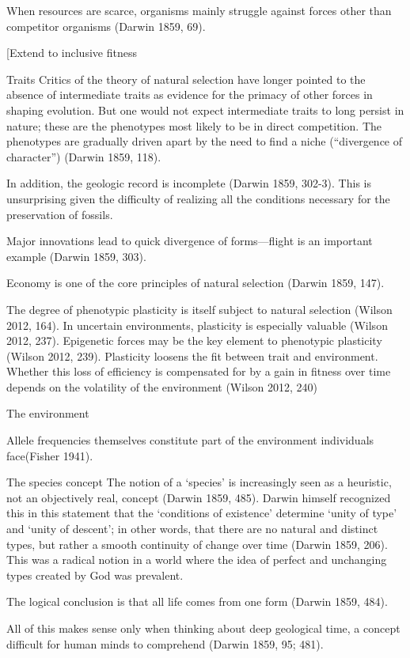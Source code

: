 \documentclass{tufte-book} %
\begin{document}
When resources are scarce, organisms mainly struggle against forces other than competitor organisms (Darwin 1859, 69). 

[Extend to inclusive fitness

Traits 
Critics of the theory of  natural selection have longer pointed to the absence of intermediate traits as evidence for the primacy of other forces in shaping evolution. But one would not expect intermediate traits to long persist in nature; these are the phenotypes most likely to be in direct competition. The phenotypes are gradually driven apart by the need to find a niche (“divergence of character”) (Darwin 1859, 118). 

In addition, the geologic record is incomplete (Darwin 1859, 302-3). This is unsurprising given the difficulty of realizing all the conditions necessary for the preservation of fossils. 

Major innovations lead to quick divergence of forms—flight is an important example (Darwin 1859, 303). 

Economy is one of the core principles of natural selection (Darwin 1859, 147). 

The degree of phenotypic plasticity is itself subject to natural selection (Wilson 2012, 164). In uncertain environments, plasticity is especially valuable (Wilson 2012, 237). Epigenetic forces may be the key element to phenotypic plasticity (Wilson 2012, 239). Plasticity loosens the fit between trait and environment. Whether this loss of efficiency is compensated for by a gain in fitness over time depends on the volatility of the environment (Wilson 2012, 240)


The environment

Allele frequencies themselves constitute part of the environment individuals face(Fisher 1941). 

The species concept
The notion of a ‘species’ is increasingly seen as a heuristic, not an objectively real, concept (Darwin 1859, 485). Darwin himself recognized this in this statement that the ‘conditions of existence’ determine ‘unity of type’ and ‘unity of descent’; in other words, that there are no natural and distinct types, but rather a smooth continuity of change over time (Darwin 1859, 206). This was a radical notion in a world where the idea of perfect and unchanging types created by God was prevalent. 

The logical conclusion is that all life comes from one form (Darwin 1859, 484). 

All of this makes sense only when thinking about deep geological time, a concept difficult for human minds to comprehend (Darwin 1859, 95; 481). 
\end{document}
